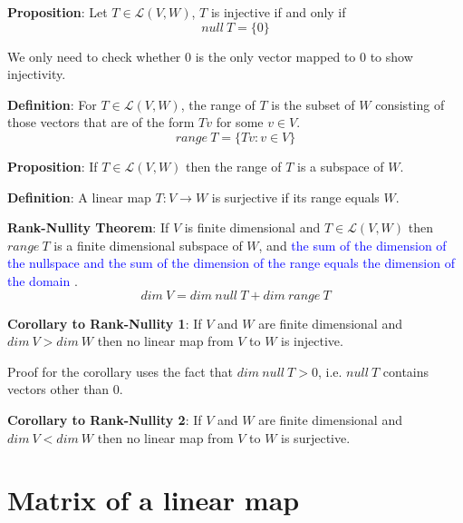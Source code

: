 \documentclass[a4paper, 10pt]{report}
\begin{document}
\begin{framed}
   \textbf{Proposition}: Let $T \in \mathcal{L}(V, W)$, $T$ is injective if and only if 
   \[
     null\ T = \{ 0 \} 
   \] 
\end{framed}
We only need to check whether $0$ is the only vector mapped to $0$ to show injectivity. \\


\begin{framed}
   \textbf{Definition}: For $T \in \mathcal{L}(V, W)$, the range of $T$  is the subset of $W$ consisting of those vectors that are of the form $Tv$ for some $v \in V$. 
    \[
     range\ T = \{ Tv: v \in V \} 
   \] 
\end{framed}

\begin{framed}
   \textbf{Proposition}: If $T \in \mathcal{L}(V, W)$ then the range of $T$ is a subspace of $W$. 
\end{framed}

\begin{framed}
   \textbf{Definition}: A linear map $T: V \rightarrow W$ is surjective if its range equals $W$. 
\end{framed}

\begin{framed}
   \textbf{Rank-Nullity Theorem}: If $V$ is finite dimensional and $T \in \mathcal{L}(V, W)$ then $range\ T$ is a finite dimensional subspace of $W$, and \textcolor{blue}{the sum of the dimension of the nullspace and the sum of the dimension of the range equals the dimension of the domain} . 
   \[
     dim\ V = dim\ null\ T + dim\ range\ T
   \] 
\end{framed}

\begin{framed}
   \textbf{Corollary to Rank-Nullity 1}: If $V$ and $W$ are finite dimensional and $dim\ V > dim\ W$ then no linear map from $V$ to $W$ is injective. 
\end{framed}

Proof for the corollary uses the fact that $dim\ null\ T > 0$, i.e. $null\ T$ contains vectors other than $0$. \\

\begin{framed}
   \textbf{Corollary to Rank-Nullity 2}: If $V$ and $W$ are finite dimensional and $dim\ V < dim\ W$ then no linear map from $V$ to $W$ is surjective. 
\end{framed}

\section{Matrix of a linear map}
\end{document}
